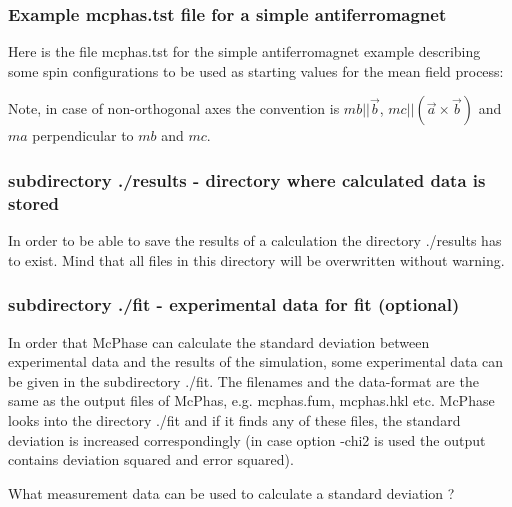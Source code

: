 \subsubsection{Example {\prg mcphas.tst} file  for a simple antiferromagnet}

Here is the file {\prg mcphas.tst} for the simple antiferromagnet example
describing some spin configurations
to be used as starting values for the mean field process:


Note, in case of non-orthogonal axes the convention 
is $mb||\vec b$, $mc||(\vec a \times \vec b)$ and $ma$ perpendicular to $mb$ and $mc$.

\subsubsection{subdirectory {\prg ./results} - directory where calculated data is stored}

In order to be able to save the results of a calculation the directory {\prg ./results} has to
exist. Mind that all files in this directory will be overwritten without warning. 

\subsubsection{subdirectory {\prg ./fit} - experimental data for fit (optional) } 

In order that {\prg McPhase} can calculate the standard deviation between
 experimental data and the results of the simulation, some experimental data
 can be given in the subdirectory {\prg ./fit}. The filenames and the data-format
 are the same as the output files of {\prg McPhas}, e.g. {\prg mcphas.fum}, {\prg mcphas.hkl}
 etc. {\prg McPhase} looks into the directory {\prg ./fit} and if it finds any
 of these files, the standard deviation is increased correspondingly (in case option {\prg -chi2} is
used the output contains deviation squared and error squared).

What measurement data can be used to calculate a standard deviation ?

